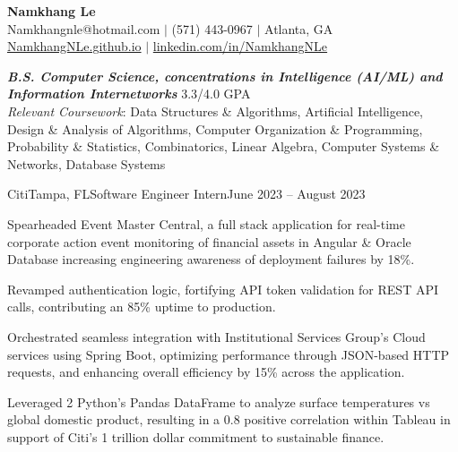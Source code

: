 \documentclass{article}
\begin{document}
\thispagestyle{empty}

\begin{center}
    \textbf{\LARGE Namkhang Le} \\
    Namkhangnle@hotmail.com $|$ (571) 443-0967 $|$ Atlanta, GA \\
    \href{https://namkhangnle.github.io/}{NamkhangNLe.github.io} $|$ \href{https://www.linkedin.com/in/namkhangnle/}{linkedin.com/in/NamkhangNLe}
\end{center}

\begin{flushleft}


{\textbf{\textit{B.S. Computer Science, concentrations in Intelligence (AI/ML) and Information Internetworks}} \hfill 3.3/4.0 GPA \\ \textit{Relevant Coursework}: Data Structures \& Algorithms, Artificial Intelligence, Design \& Analysis of Algorithms, Computer Organization \& Programming, Probability \& Statistics, Combinatorics, Linear Algebra, Computer Systems \& Networks, Database Systems }


    \begin{experience}{Citi}{Tampa, FL}{Software Engineer Intern}{June 2023 -- August 2023}
        \item Spearheaded Event Master Central, a full stack application for real-time corporate action event monitoring of financial assets in Angular \& Oracle Database increasing engineering awareness of deployment failures by 18\%.
        \item Revamped authentication logic, fortifying API token validation for REST API calls, contributing an 85\% uptime to production.
        \item Orchestrated seamless integration with Institutional Services Group's Cloud services using Spring Boot, optimizing performance through JSON-based HTTP requests, and enhancing overall efficiency by 15\% across the application.
        \item Leveraged 2 Python’s Pandas DataFrame to analyze surface temperatures vs global domestic product, resulting in a 0.8 positive correlation within Tableau in support of Citi's 1 trillion dollar commitment to sustainable finance.
    \end{experience}


\end{flushleft}
\end{document}
